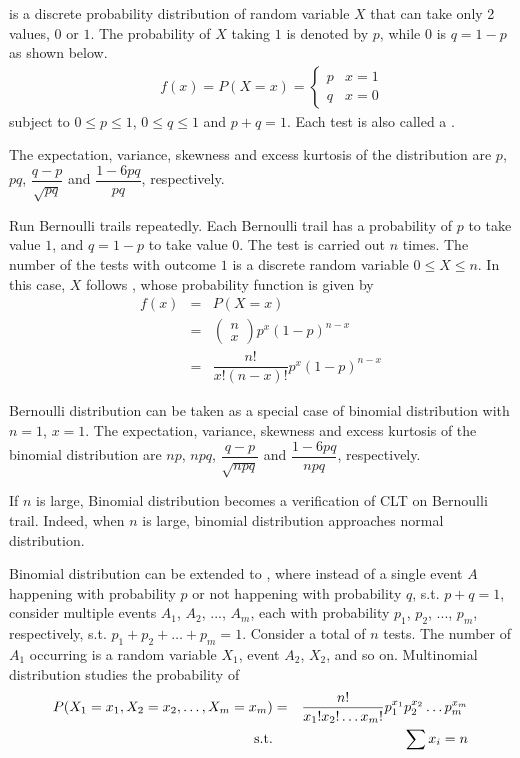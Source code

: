 is a discrete probability distribution of random variable $X$ that can take only 2 values, $0$ or $1$. The probability of $X$ taking $1$ is denoted by $p$, while $0$ is $q=1-p$ as shown below.
\begin{eqnarray}
  && f(x) = P(X=x) = \left\{\begin{array}{cc}
                           p & x=1 \\
                           q & x=0
                         \end{array}\right. \nonumber
\end{eqnarray}
subject to $0\leq p \leq 1$, $0\leq q \leq 1$ and $p+q=1$. Each test is also called a .

The expectation, variance, skewness and excess kurtosis of the distribution are $p$, $pq$, $\dfrac{q-p}{\sqrt{pq}}$ and $\dfrac{1-6pq}{pq}$, respectively.

Run Bernoulli trails repeatedly. Each Bernoulli trail has a probability of $p$ to take value $1$, and $q=1-p$ to take value $0$. The test is carried out $n$ times. The number of the tests with outcome $1$ is a discrete random variable $0\leq X \leq n$. In this case, $X$ follows , whose probability function is given by
\begin{eqnarray}
  f(x) &=& P(X=x) \nonumber \\
  &=& \left(\begin{array}{c}
              n \\
              x
            \end{array}\right)p^x(1-p)^{n-x} \nonumber \\
  &=& \dfrac{n!}{x!(n-x)!}p^x(1-p)^{n-x}
\end{eqnarray}

Bernoulli distribution can be taken as a special case of binomial distribution with $n=1$, $x=1$. The expectation, variance, skewness and excess kurtosis of the binomial distribution are $np$, $npq$, $\dfrac{q-p}{\sqrt{npq}}$ and $\dfrac{1-6pq}{npq}$, respectively.

If $n$ is large, Binomial distribution becomes a verification of CLT on Bernoulli trail. Indeed, when $n$ is large, binomial distribution approaches normal distribution.

Binomial distribution can be extended to , where instead of a single event $A$ happening with probability $p$ or not happening with probability $q$, s.t. $p+q=1$, consider multiple events $A_1$, $A_2$, ..., $A_m$, each with probability $p_1$, $p_2$, ..., $p_m$, respectively, s.t. $p_1+p_2+\ldots+p_m=1$. Consider a total of $n$ tests. The number of $A_1$ occurring is a random variable $X_1$, event $A_2$, $X_2$, and so on. Multinomial distribution studies the probability of
\begin{eqnarray}
  P(X_1=x_1, X_2=x_2,\ldots, X_m = x_m) &=& \dfrac{n!}{x_1!x_2!\ldots x_m!}p_1^{x_1}p_2^{x_2}\ldots p_m^{x_m} \nonumber \\
  \textup{s.t.} && \sum x_i = n \nonumber
\end{eqnarray}


